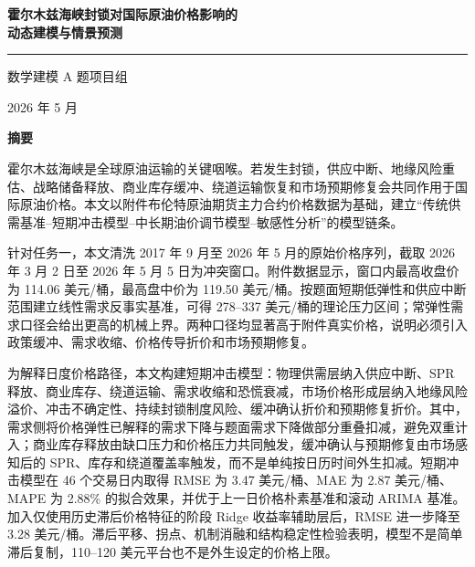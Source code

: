 \thispagestyle{plain}
\normalfont
\enlargethispage{2\baselineskip}

\begin{center}
\vspace*{0.15cm}
{\sffamily\bfseries{}\color{OilDark}霍尔木兹海峡封锁对国际原油价格影响的\\[0.25em]动态建模与情景预测\par}
\vspace{0.65em}
{\color{OilBlue}\rule{0.26\linewidth}{1.1pt}}\par
\vspace{0.8em}
{\large 数学建模 A 题项目组\par}
\vspace{0.45em}
{\large 2026 年 5 月\par}
\vspace{0.9em}
{\sffamily\bfseries\large\color{OilDark}摘\quad 要}
\end{center}

\vspace{-0.2em}
\small
霍尔木兹海峡是全球原油运输的关键咽喉。若发生封锁，供应中断、地缘风险重估、战略储备释放、商业库存缓冲、绕道运输恢复和市场预期修复会共同作用于国际原油价格。本文以附件布伦特原油期货主力合约价格数据为基础，建立“传统供需基准--短期冲击模型--中长期油价调节模型--敏感性分析”的模型链条。

针对任务一，本文清洗 2017 年 9 月至 2026 年 5 月的原始价格序列，截取 2026 年 3 月 2 日至 2026 年 5 月 5 日为冲突窗口。附件数据显示，窗口内最高收盘价为 114.06 美元/桶，最高盘中价为 119.50 美元/桶。按题面短期低弹性和供应中断范围建立线性需求反事实基准，可得 278--337 美元/桶的理论压力区间；常弹性需求口径会给出更高的机械上界。两种口径均显著高于附件真实价格，说明必须引入政策缓冲、需求收缩、价格传导折价和市场预期修复。

为解释日度价格路径，本文构建短期冲击模型：物理供需层纳入供应中断、SPR 释放、商业库存、绕道运输、需求收缩和恐慌衰减，市场价格形成层纳入地缘风险溢价、冲击不确定性、持续封锁制度风险、缓冲确认折价和预期修复折价。其中，需求侧将价格弹性已解释的需求下降与题面需求下降做部分重叠扣减，避免双重计入；商业库存释放由缺口压力和价格压力共同触发，缓冲确认与预期修复由市场感知后的 SPR、库存和绕道覆盖率触发，而不是单纯按日历时间外生扣减。短期冲击模型在 46 个交易日内取得 RMSE 为 3.47 美元/桶、MAE 为 2.87 美元/桶、MAPE 为 2.88\% 的拟合效果，并优于上一日价格朴素基准和滚动 ARIMA 基准。加入仅使用历史滞后价格特征的阶段 Ridge 收益率辅助层后，RMSE 进一步降至 3.28 美元/桶。滞后平移、拐点、机制消融和结构稳定性检验表明，模型不是简单滞后复制，110--120 美元平台也不是外生设定的价格上限。

